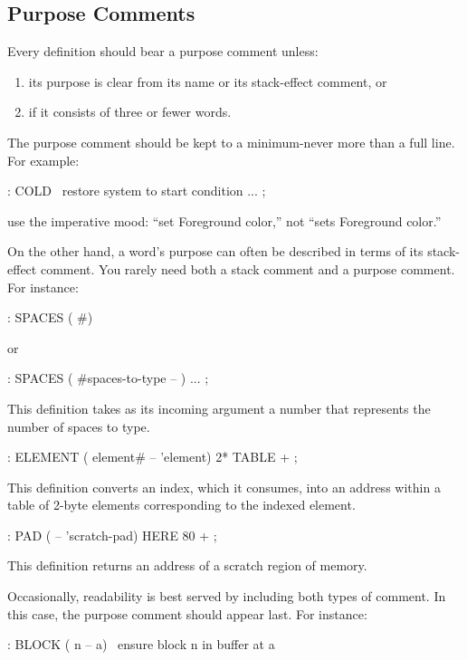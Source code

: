 \subsection{Purpose Comments}%

\begin{tip}
Every definition should bear a purpose comment unless:
\medskip
\begin{enumerate}
\item its purpose is clear from its name or its stack-effect comment, or
\item if it consists of three or fewer words.
\end{enumerate}
\end{tip}
The purpose comment should be kept to a minimum-never more than a full
line.  For example:
\begin{Code}
: COLD   \ restore system to start condition
    ... ;
\end{Code}
use the imperative mood: ``set Foreground color,'' not ``sets
Foreground color.''

On the other hand, a word's purpose can often be described in terms of
its stack-effect comment.  You rarely need both a stack comment and a
purpose comment.  For instance:
\begin{Code}
: SPACES  ( #)
\end{Code}
or
\begin{Code}
: SPACES  ( #spaces-to-type -- )   ... ;
\end{Code}
This definition takes as its incoming argument a number that
represents the number of spaces to type.
\begin{Code}
: ELEMENT  ( element# -- 'element)  2*  TABLE + ;
\end{Code}
This definition converts an index, which it consumes, into an address
within a table of 2-byte elements corresponding to the indexed element.
\begin{Code}
: PAD  ( -- 'scratch-pad)  HERE  80 + ;
\end{Code}
This definition returns an address of a scratch region of memory.

Occasionally, readability is best served by including both types of
comment. In this case, the purpose comment should appear last.  For
instance:
\begin{Code}
: BLOCK  ( n -- a)  \   ensure block n in buffer at a
\end{Code}

